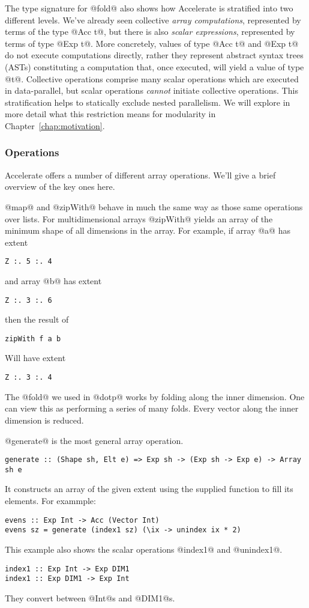 The type signature for @fold@ also shows how Accelerate is stratified into two different levels. We've already seen collective \emph{array computations}, represented by terms of the type @Acc t@, but there is also \emph{scalar expressions}, represented by terms of type @Exp t@. More concretely, values of type @Acc t@ and @Exp t@ do not execute computations directly, rather they represent abstract syntax trees (ASTs) constituting a computation that, once executed, will yield a value of type @t@. Collective operations comprise many scalar operations which are executed in data-parallel, but scalar operations \emph{cannot} initiate collective operations. This stratification helps to statically exclude nested parallelism. We will explore in more detail what this restriction means for modularity in Chapter~\ref{chap:motivation}.

\subsubsection{Operations}

Accelerate offers a number of different array operations. We'll give a brief overview of the key ones here.

@map@ and @zipWith@ behave in much the same way as those same operations over lists. For multidimensional arrays @zipWith@ yields an array of the minimum shape of all dimensions in the array. For example, if array @a@ has extent
%
\begin{lstlisting}
Z :. 5 :. 4
\end{lstlisting}
%
and array @b@ has extent
%
\begin{lstlisting}
Z :. 3 :. 6
\end{lstlisting}
%
then the result of
%
\begin{lstlisting}
zipWith f a b
\end{lstlisting}
%
Will have extent
%
\begin{lstlisting}
Z :. 3 :. 4
\end{lstlisting}
%

The @fold@ we used in @dotp@ works by folding along the inner dimension. One can view this as performing a series of many folds. Every vector along the inner dimension is reduced.

@generate@ is the most general array operation.
%
\begin{lstlisting}
generate :: (Shape sh, Elt e) => Exp sh -> (Exp sh -> Exp e) -> Array sh e
\end{lstlisting}
%
It constructs an array of the given extent using the supplied function to fill its elements. For exammple:
%
\begin{lstlisting}
evens :: Exp Int -> Acc (Vector Int)
evens sz = generate (index1 sz) (\ix -> unindex ix * 2)
\end{lstlisting}
%
This example also shows the scalar operations @index1@ and @unindex1@.
%
\begin{lstlisting}
index1 :: Exp Int -> Exp DIM1
index1 :: Exp DIM1 -> Exp Int
\end{lstlisting}
%
They convert between @Int@s and @DIM1@s.

